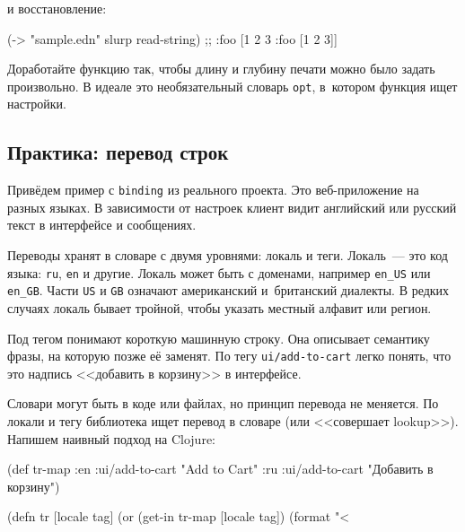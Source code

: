 \fi

\noindent
и восстановление:

\begin{english}
  \begin{clojure}
(-> "sample.edn" slurp read-string)
;; {:foo [1 2 3 {:foo [1 2 3]}]}
  \end{clojure}
\end{english}


Доработайте функцию так, чтобы длину и глубину печати можно было задать
произвольно. В идеале это необязательный словарь \verb|opt|, в~котором функция
ищет настройки.

\subsection{Практика: перевод строк}

\label{translate}

Привёдем пример с \verb|binding| из реального проекта. Это веб-приложение на
разных языках. В зависимости от настроек клиент видит английский или русский
текст в интерфейсе и сообщениях.


Переводы хранят в словаре с двумя уровнями: локаль и теги. Локаль~--- это код
языка: \verb|ru|, \verb|en| и другие. Локаль может быть с доменами, например
\verb|en_US| или \verb|en_GB|. Части \verb|US| и \verb|GB| означают
американский и~британский диалекты. В редких случаях локаль бывает тройной,
чтобы указать местный алфавит или регион.

Под тегом понимают короткую машинную строку. Она описывает семантику фразы, на
которую позже её заменят. По тегу \verb|ui/add-to-cart| легко понять, что это
надпись <<добавить в корзину>> в интерфейсе.

Словари могут быть в коде или файлах, но принцип перевода не меняется. По локали
и тегу библиотека ищет перевод в словаре (или <<совершает lookup>>). Напишем
наивный подход на Clojure:

\ifnarrow

  \begin{clojure}
(def tr-map
  {:en {:ui/add-to-cart "Add to Cart"}
   :ru {:ui/add-to-cart
        "Добавить в корзину"}})

(defn tr [locale tag]
  (or (get-in tr-map [locale tag])
      (format "<%
  \end{clojure}

